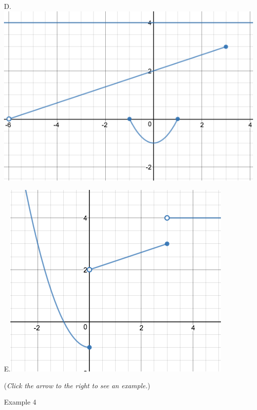 \documentclass{ximera}
\begin{document}
\begin{question}
\begin{center}
\begin{expandable}
\begin{expandable}
\begin{multicols}{2}
\begin{center}
D. \includegraphics[scale=0.2]{PWGraph5}
\end{center}

\end{multicols}

\begin{center}
E.\includegraphics[scale=0.18]{PWGraph4}
\end{center}

\begin{multipleChoice}
\end{multipleChoice}
\begin{flushright}
{\color{blue}(\emph{Click the arrow to the right to see an example.})}
\end{flushright}
\begin{expandable}
Example 4
\end{expandable}
\end{expandable}
\end{expandable}
\end{center}
\end{question}
\end{document}
